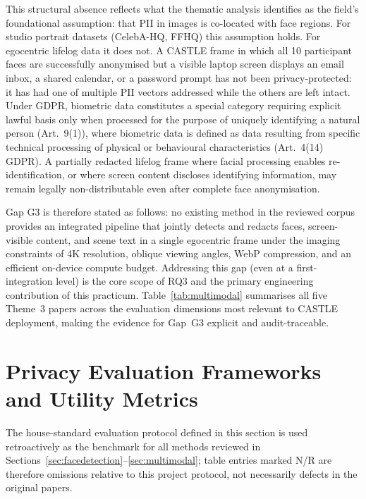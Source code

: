 \documentclass[12pt, onecolumn]{IEEEtran}
\begin{document}
This structural absence reflects what the thematic analysis identifies
as the field's foundational assumption: that PII in images is
co-located with face regions. For studio portrait datasets (CelebA-HQ,
FFHQ) this assumption holds. For egocentric lifelog data it does not. A
CASTLE frame in which all 10 participant faces are successfully
anonymised but a visible laptop screen displays an email inbox, a
shared calendar, or a password prompt has not been privacy-protected:
it has had one of multiple PII vectors addressed while the others are
left intact. Under GDPR, biometric data constitutes a special category
requiring explicit lawful basis only when processed for the purpose of
uniquely identifying a natural person (Art.~9(1)), where biometric data
is defined as data resulting from specific technical processing of
physical or behavioural characteristics (Art.~4(14) GDPR). A partially
redacted lifelog frame where facial processing enables
re-identification, or where screen content discloses identifying
information, may remain legally non-distributable even after complete
face anonymisation.

Gap G3 is therefore stated as follows: no existing method in the
reviewed corpus provides an integrated pipeline that jointly detects
and redacts faces, screen-visible content, and scene text in a single
egocentric frame under the imaging constraints of 4K resolution, oblique
viewing angles, WebP compression, and an efficient on-device compute budget.
Addressing this gap (even at a first-integration level) is the core
scope of RQ3 and the primary engineering contribution of this
practicum. Table~\ref{tab:multimodal} summarises all five Theme~3
papers across the evaluation dimensions most relevant to CASTLE
deployment, making the evidence for Gap~G3 explicit and
audit-traceable.





\section{Privacy Evaluation Frameworks and Utility Metrics}
\label{sec:evaluation}

The house-standard evaluation protocol defined in this section is used
retroactively as the benchmark for all methods reviewed in
Sections~\ref{sec:facedetection}--\ref{sec:multimodal}; table entries
marked N/R are therefore omissions relative to this project protocol,
not necessarily defects in the original papers.
\end{document}
